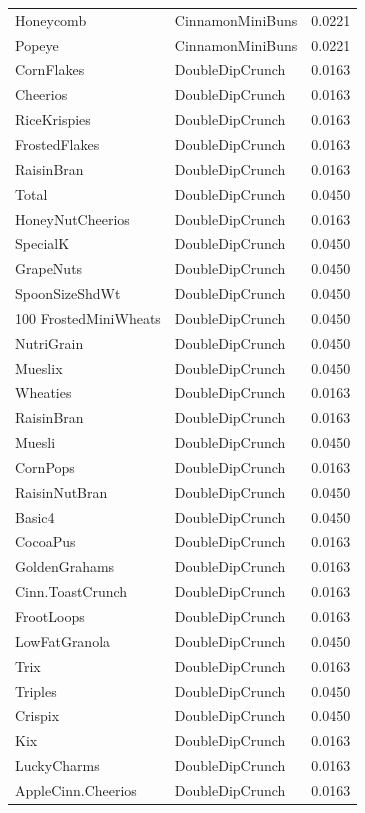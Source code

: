 \begin{longtable}{llr}
Honeycomb & CinnamonMiniBuns & 0.0221 \\
Popeye & CinnamonMiniBuns & 0.0221 \\
CornFlakes & DoubleDipCrunch & 0.0163 \\
Cheerios & DoubleDipCrunch & 0.0163 \\
RiceKrispies & DoubleDipCrunch & 0.0163 \\
FrostedFlakes & DoubleDipCrunch & 0.0163 \\
RaisinBran & DoubleDipCrunch & 0.0163 \\
Total & DoubleDipCrunch & 0.0450 \\
HoneyNutCheerios & DoubleDipCrunch & 0.0163 \\
SpecialK & DoubleDipCrunch & 0.0450 \\
GrapeNuts & DoubleDipCrunch & 0.0450 \\
SpoonSizeShdWt & DoubleDipCrunch & 0.0450 \\
100%
FrostedMiniWheats & DoubleDipCrunch & 0.0450 \\
NutriGrain & DoubleDipCrunch & 0.0450 \\
Mueslix & DoubleDipCrunch & 0.0450 \\
Wheaties & DoubleDipCrunch & 0.0163 \\
RaisinBran & DoubleDipCrunch & 0.0163 \\
Muesli & DoubleDipCrunch & 0.0450 \\
CornPops & DoubleDipCrunch & 0.0163 \\
RaisinNutBran & DoubleDipCrunch & 0.0450 \\
Basic4 & DoubleDipCrunch & 0.0450 \\
CocoaPus & DoubleDipCrunch & 0.0163 \\
GoldenGrahams & DoubleDipCrunch & 0.0163 \\
Cinn.ToastCrunch & DoubleDipCrunch & 0.0163 \\
FrootLoops & DoubleDipCrunch & 0.0163 \\
LowFatGranola & DoubleDipCrunch & 0.0450 \\
Trix & DoubleDipCrunch & 0.0163 \\
Triples & DoubleDipCrunch & 0.0450 \\
Crispix & DoubleDipCrunch & 0.0450 \\
Kix & DoubleDipCrunch & 0.0163 \\
LuckyCharms & DoubleDipCrunch & 0.0163 \\
AppleCinn.Cheerios & DoubleDipCrunch & 0.0163 \\

\end{longtable}
